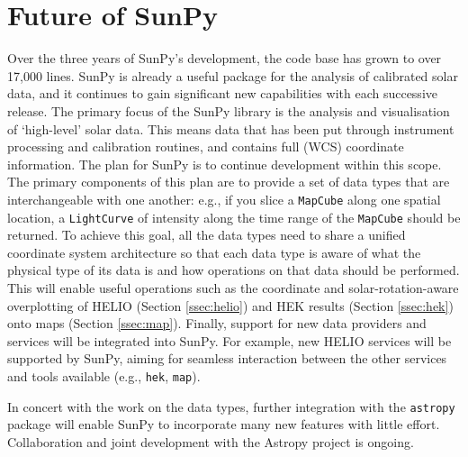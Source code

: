 \section{Future of SunPy}\label{sec:future}

Over the three years of SunPy's development, the code base has grown to over 17,000 lines. 
SunPy is already a 
useful package for the analysis of calibrated solar data, and it
continues to gain significant new capabilities with each successive release.
The primary focus of the 
SunPy library is the analysis and visualisation of `high-level' solar 
data. This means data that has been put through instrument processing 
and 
calibration routines, and contains full (WCS) coordinate information. 
The plan for SunPy is to continue development within this 
scope. The 
primary components of this plan are to provide a set of data types 
that are 
interchangeable with one another: e.g., if you slice a 
\texttt{MapCube} 
along one spatial location, a \texttt{LightCurve} of intensity along the 
time range of 
the \texttt{MapCube} should be returned. To achieve this goal, all the 
data 
types need to share a unified coordinate system architecture so that 
each data 
type is aware of what the physical type of its data is and how 
operations on 
that data should be performed. This will enable useful operations
such as the coordinate and solar-rotation-aware 
overplotting of HELIO (Section \ref{ssec:helio}) and HEK
results (Section \ref{ssec:hek}) onto maps (Section \ref{ssec:map}).
Finally, support for new data providers and services will be integrated into SunPy.
For example, new HELIO services will be supported by SunPy, aiming for
seamless interaction between the other services and tools available (e.g., 
\texttt{hek}, \texttt{map}).  

In concert with the work on the data types, further integration with 
the 
\texttt{astropy} package will enable SunPy to incorporate many new features
with little effort. Collaboration and joint development with the 
Astropy project \citep{theastropycollaboration2013} is ongoing.
